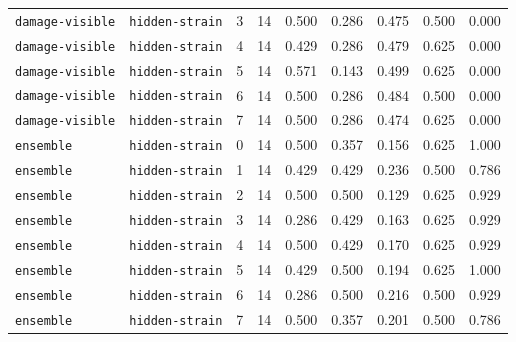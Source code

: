 \documentclass{article}
\begin{document}
\begin{center}
\begin{tabular}{llccccccc}
\texttt{damage-visible} & \texttt{hidden-strain} & 3 & 14 & 0.500 & 0.286 & 0.475 & 0.500 & 0.000 \\
\texttt{damage-visible} & \texttt{hidden-strain} & 4 & 14 & 0.429 & 0.286 & 0.479 & 0.625 & 0.000 \\
\texttt{damage-visible} & \texttt{hidden-strain} & 5 & 14 & 0.571 & 0.143 & 0.499 & 0.625 & 0.000 \\
\texttt{damage-visible} & \texttt{hidden-strain} & 6 & 14 & 0.500 & 0.286 & 0.484 & 0.500 & 0.000 \\
\texttt{damage-visible} & \texttt{hidden-strain} & 7 & 14 & 0.500 & 0.286 & 0.474 & 0.625 & 0.000 \\
\texttt{ensemble} & \texttt{hidden-strain} & 0 & 14 & 0.500 & 0.357 & 0.156 & 0.625 & 1.000 \\
\texttt{ensemble} & \texttt{hidden-strain} & 1 & 14 & 0.429 & 0.429 & 0.236 & 0.500 & 0.786 \\
\texttt{ensemble} & \texttt{hidden-strain} & 2 & 14 & 0.500 & 0.500 & 0.129 & 0.625 & 0.929 \\
\texttt{ensemble} & \texttt{hidden-strain} & 3 & 14 & 0.286 & 0.429 & 0.163 & 0.625 & 0.929 \\
\texttt{ensemble} & \texttt{hidden-strain} & 4 & 14 & 0.500 & 0.429 & 0.170 & 0.625 & 0.929 \\
\texttt{ensemble} & \texttt{hidden-strain} & 5 & 14 & 0.429 & 0.500 & 0.194 & 0.625 & 1.000 \\
\texttt{ensemble} & \texttt{hidden-strain} & 6 & 14 & 0.286 & 0.500 & 0.216 & 0.500 & 0.929 \\
\texttt{ensemble} & \texttt{hidden-strain} & 7 & 14 & 0.500 & 0.357 & 0.201 & 0.500 & 0.786 \\
\bottomrule
\end{tabular}
\end{center}
\end{document}
